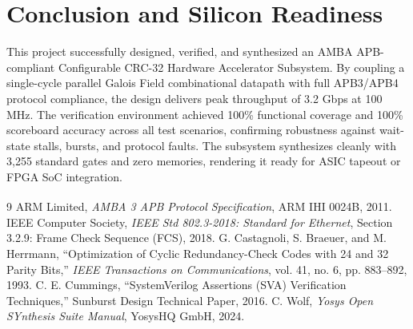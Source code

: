 \documentclass[11pt,a4paper]{article}
\begin{document}
\section{Conclusion and Silicon Readiness}

This project successfully designed, verified, and synthesized an AMBA APB-compliant Configurable CRC-32 Hardware Accelerator Subsystem. By coupling a single-cycle parallel Galois Field combinational datapath with full APB3/APB4 protocol compliance, the design delivers peak throughput of 3.2 Gbps at 100 MHz. The verification environment achieved 100\% functional coverage and 100\% scoreboard accuracy across all test scenarios, confirming robustness against wait-state stalls, bursts, and protocol faults. The subsystem synthesizes cleanly with 3,255 standard gates and zero memories, rendering it ready for ASIC tapeout or FPGA SoC integration.

\begin{thebibliography}{9}
 ARM Limited, \textit{AMBA\textsuperscript{\textregistered} 3 APB Protocol Specification}, ARM IHI 0024B, 2011.
 IEEE Computer Society, \textit{IEEE Std 802.3-2018: Standard for Ethernet}, Section 3.2.9: Frame Check Sequence (FCS), 2018.
 G. Castagnoli, S. Braeuer, and M. Herrmann, ``Optimization of Cyclic Redundancy-Check Codes with 24 and 32 Parity Bits,'' \textit{IEEE Transactions on Communications}, vol. 41, no. 6, pp. 883--892, 1993.
 C. E. Cummings, ``SystemVerilog Assertions (SVA) Verification Techniques,'' Sunburst Design Technical Paper, 2016.
 C. Wolf, \textit{Yosys Open SYnthesis Suite Manual}, YosysHQ GmbH, 2024.
\end{thebibliography}
\end{document}

